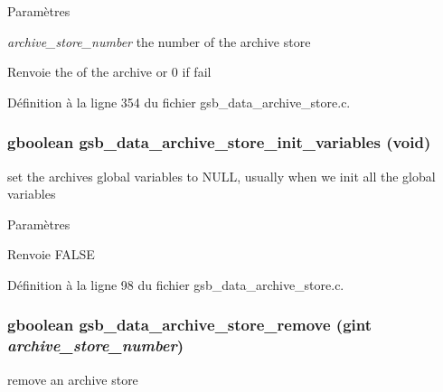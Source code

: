 \begin{DoxyParams}{Paramètres}
\item[{\em archive\_\-store\_\-number}]the number of the archive store\end{DoxyParams}
\begin{DoxyReturn}{Renvoie}
the of the archive or 0 if fail 
\end{DoxyReturn}


Définition à la ligne 354 du fichier gsb\_\-data\_\-archive\_\-store.c.

\subsubsection[{gsb\_\-data\_\-archive\_\-store\_\-init\_\-variables}]{\setlength{\rightskip}{0pt plus 5cm}gboolean gsb\_\-data\_\-archive\_\-store\_\-init\_\-variables (void)}\label{gsb__data__archive__store_8h_a92c3b325efef096b310d0b4303060fa8}
set the archives global variables to NULL, usually when we init all the global variables


\begin{DoxyParams}{Paramètres}
\item[{\em }]\end{DoxyParams}
\begin{DoxyReturn}{Renvoie}
FALSE 
\end{DoxyReturn}


Définition à la ligne 98 du fichier gsb\_\-data\_\-archive\_\-store.c.

\subsubsection[{gsb\_\-data\_\-archive\_\-store\_\-remove}]{\setlength{\rightskip}{0pt plus 5cm}gboolean gsb\_\-data\_\-archive\_\-store\_\-remove (gint {\em archive\_\-store\_\-number})}\label{gsb__data__archive__store_8h_a0054cc9c2f69b53c33e31fc81330052c}
remove an archive store


